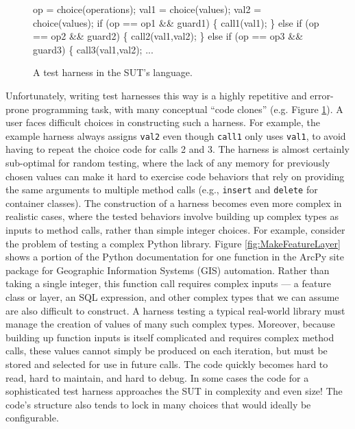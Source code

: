 \begin{figure}[b]
{\scriptsize
\begin{code}
op = choice(operations);
val1 = choice(values);
val2 = choice(values);
if (op == op1 \&\& guard1) \{
    call1(val1);
\} else if (op == op2 \&\& guard2) \{
    call2(val1,val2);
\} else if (op == op3 \&\& guard3) \{
    call3(val1,val2);
...
\end{code}
}
\vspace{-0.15in}
\caption {A test harness in the SUT's language.}
\label{fig:badharness}
\end{figure}

Unfortunately, writing test harnesses this way is a highly repetitive
and error-prone programming task, with many conceptual ``code clones''
(e.g. Figure \ref{fig:badharness}). A user faces difficult choices in
constructing such a harness. For example, the example harness always assigns {\tt val2} even
though {\tt call1} only uses {\tt val1}, to avoid having to repeat the
choice code for calls 2 and 3.  The harness is almost certainly
sub-optimal for  random testing, where the lack of any
memory for previously chosen values can make it hard to exercise code
behaviors that rely on providing the same arguments to multiple method
calls (e.g., {\tt insert} and {\tt delete} for container classes).
The construction of a harness becomes even more complex in realistic
cases, where the tested behaviors involve building up complex types as
inputs to method calls, rather than simple integer choices. For
example, consider the problem of testing a complex Python library.  Figure
\ref{fig:MakeFeatureLayer} shows a portion of the Python documentation
for one function in the ArcPy \cite{ArcPy} site
package for Geographic Information Systems (GIS) automation.  Rather than taking a single integer, this
function call requires complex inputs --- a feature class or
layer, an SQL expression, and other complex types that we can assume
are also difficult to construct.  A harness testing a typical
real-world library must manage the creation of values of many such complex types.
Moreover, because building up function inputs is itself complicated
and requires complex method calls, these values cannot simply be produced on each iteration, but must be
stored and selected for use in future calls.
The code quickly becomes hard to read, hard to maintain, and hard to
debug.  In some cases \cite{AMAI} the code for a sophisticated test
harness approaches the SUT in complexity and even size!  The code's
structure also tends to lock in many choices that would ideally be configurable.

